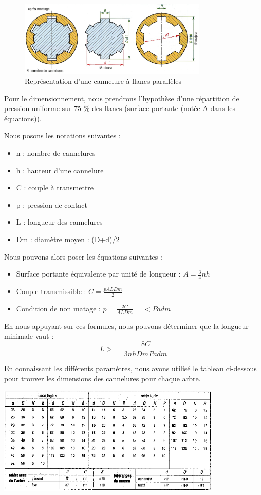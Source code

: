 \documentclass{config}
\begin{document}
\begin{spacing}{1.2}
\begin{figure}[h!]
    \centering
    \includegraphics[width=0.8\textwidth]{cannelure_parallele.jpg}
    \caption{Représentation d'une cannelure à flancs parallèles}
\end{figure}

Pour le dimensionnement, nous prendrons l'hypothèse d'une répartition de pression uniforme sur 75 \% des flancs (surface portante (notée A dans les équations)).

Nous posons les notations suivantes :
\begin{itemize}
\item n : nombre de cannelures
\item h : hauteur d'une cannelure
\item C : couple à transmettre
\item p : pression de contact
\item L : longueur des cannelures
\item Dm : diamètre moyen : (D+d)/2
\end{itemize}

Nous pouvons alors poser les équations suivantes :

\begin{itemize}
    \item Surface portante équivalente par unité de longueur : $A = \frac{3}{4} n h$
    \item Couple transmissible : $C = \frac{p A L Dm}{2}$
    \item Condition de non matage : $p=  \frac{2 C}{A L Dm}=<  Padm$
\end{itemize} 

En nous appuyant sur ces formules, nous pouvons déterminer que la longueur minimale vaut :
\[L >= \frac{8 C}{3 n h Dm Padm}\]

En connaissant les différents paramètres, nous avons utilisé le tableau ci-dessous pour trouver les dimensions des cannelures pour chaque arbre.

\begin{center}
\includegraphics[width=0.8\textwidth]{tab_cannelures.PNG}
\end{center}
    

\end{spacing}
\end{document}
